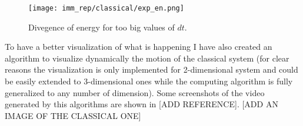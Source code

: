 \documentclass[10pt,a4paper]{article}
\begin{document}
\begin{figure}[h]
	\begin{center}
		\texttt{[image: imm\_rep/classical/exp\_en.png]}
	\end{center}
	\caption{Divegence of energy for too big values of $dt$.}
	\label{fig: exp_en}
\end{figure}

\vspace{15pt}

To have a better visualization of what is happening I have also created an algorithm to visualize dynamically the motion of the classical system (for clear reasons the visualization is only implemented for 2-dimensional system and could be easily extended to 3-dimensional ones while the computing algorithm is fully generalized to any number of dimension). Some screenshots of the video generated by this algorithms are shown in [ADD REFERENCE].
[ADD AN IMAGE OF THE CLASSICAL ONE] 
\end{document}
